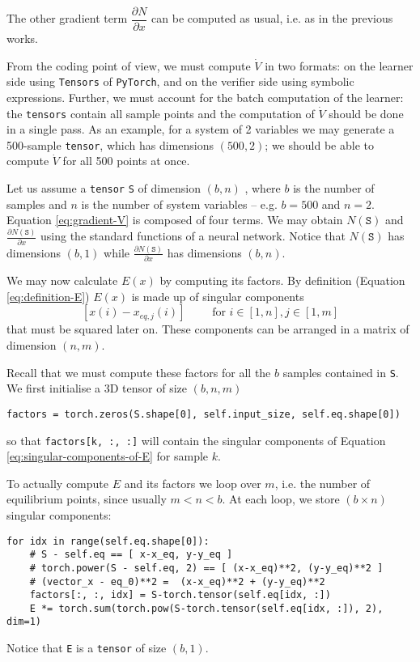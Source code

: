 \documentclass[]{article}
\begin{document}
The other gradient term $\dfrac{\partial N}{\partial x}$ can be computed as usual, i.e. as in the previous works. 

\bigskip

From the coding point of view, we must compute $\dot{V}$ in  two formats: on the learner side using \verb#Tensors# of \verb#PyTorch#, and on the verifier side using symbolic expressions. 
Further, we must account for the batch computation of the learner: the \verb#tensors# contain all sample points and the computation of $\dot{V}$ should be done in a single pass. 
As an example, for a system of 2 variables we may generate a 500-sample \verb#tensor#, which has dimensions $(500, 2)$;
we should be able to compute $\dot{V}$ for all 500 points at once. 

Let us assume a \verb#tensor# \verb#S# of dimension $(b, n)$ , where $b$ is the number of samples and $n$ is the number of system variables -- e.g. $b=500$ and $n=2$.
%
Equation \eqref{eq:gradient-V} is composed of four terms. We may obtain $N(\texttt{S})$ and $\frac{\partial N(\texttt{S})}{\partial x}$ using the standard functions of a neural network. 
Notice that $N(\texttt{S})$ has dimensions $(b, 1)$ while $\frac{\partial N(\texttt{S})}{\partial x}$ has dimensions $(b, n)$. 

We may now calculate $E(x)$ by computing its factors. 
By definition (Equation \eqref{eq:definition-E}) $E(x)$ is made up of singular components 
\begin{equation}
\label{eq:singular-components-of-E}
[x(i) - x_{eq, j}(i)]
\qquad
\text{ for }
i \in [1, n], 
j \in [1, m]
\end{equation}
that must be squared later on. 
These components can be arranged in a matrix of dimension $(n, m)$.

Recall that we must compute these factors for all the $b$ samples contained in \verb#S#.
We first initialise a 3D tensor of size $(b, n, m)$
\begin{verbatim}
factors = torch.zeros(S.shape[0], self.input_size, self.eq.shape[0])
\end{verbatim}
so that 
\verb#factors[k, :, :]# will contain the singular components of Equation \eqref{eq:singular-components-of-E} for sample $k$. 

To actually compute $E$ and its factors we loop over $m$, i.e. the number of equilibrium points, since usually $m < n< b$. 
 At each loop, we store $(b \times n)$ singular components: 
\begin{verbatim}
for idx in range(self.eq.shape[0]):
    # S - self.eq == [ x-x_eq, y-y_eq ]
    # torch.power(S - self.eq, 2) == [ (x-x_eq)**2, (y-y_eq)**2 ]
    # (vector_x - eq_0)**2 =  (x-x_eq)**2 + (y-y_eq)**2
    factors[:, :, idx] = S-torch.tensor(self.eq[idx, :])
    E *= torch.sum(torch.pow(S-torch.tensor(self.eq[idx, :]), 2), dim=1)
\end{verbatim}
Notice that \verb#E# is a \verb#tensor# of size $(b, 1)$.
\end{document}
